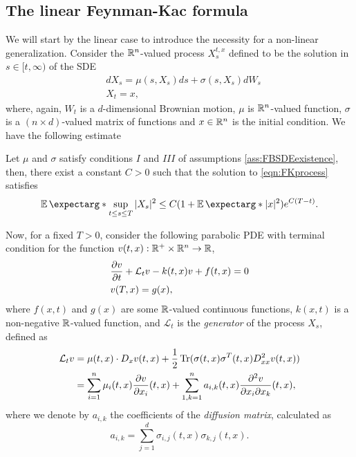 \subsection{The linear Feynman-Kac formula}
We will start by the linear case to introduce the necessity for a non-linear generalization. Consider the $\mathbb{R}^n$-valued process $X_s^{t,x}$ defined to be the solution in $s\in[t,\infty)$ of the SDE 
\begin{equation}
	\label{eqn:FKprocess}
	\begin{split}
		&dX_s=\mu(s,X_s)ds+\sigma(s,X_s)dW_s\\
		&X_t=x,
	\end{split}
\end{equation}
where, again,  $W_t$ is a $d$-dimensional Brownian motion, $\mu$ is $\mathbb{R}^n$-valued function, $\sigma$ is a $(n\times d)$-valued matrix of functions and $x\in\mathbb{R}^n$ is the initial condition. We have the following estimate 
\begin{theorem}
	\label{thm:estimationSDE}
		Let $\mu$ and $\sigma$ satisfy conditions $I$ and $III$ of assumptions \ref{ass:FBSDEexistence}, then, there exist a constant $C>0$ such that the solution to \ref{eqn:FKprocess} satisfies
		\begin{equation}
			\expect*{\sup_{t\leq s\leq T}|X_s|^2}\leq C(1+\expect*{|x|^2})e^{C(T-t)}.
		\end{equation} 
\end{theorem}

Now, for a fixed $T>0$, consider the following parabolic PDE with terminal condition for the function $v(t,x):\mathbb{R}^+\times \mathbb{R}^n\to \mathbb{R}$,
\begin{equation}
	\label{eqn:FKequation}
	\begin{split}
		&\frac{\partial v}{\partial t}+\mathcal{L}_t v-k(t,x) v+f(t,x)=0\\
		&v(T,x)=g(x),
	\end{split}
\end{equation}
where $f(x,t)$ and $g(x)$ are some $\mathbb{R}$-valued continuous functions, $k(x,t)$ is a non-negative $\mathbb{R}$-valued function, and $\mathcal{L}_t$ is the \textit{generator} of the process $X_s$, defined as
\begin{equation}
	\begin{split}
		\mathcal{L}_tv&=\mu(t,x)\cdot D_x v(t,x)+\frac{1}{2}\operatorname{Tr}(\sigma(t,x)\sigma^{T}(t,x)D_{xx}^2v(t,x))\\
		&=\sum_{i=1}^{n}\mu_i(t,x)\frac{\partial v}{\partial x_i}(t,x)+\sum_{1,k=1}^{n}a_{i,k}(t,x)\frac{\partial^2 v}{\partial x_i\partial x_k}(t,x),
	\end{split}
\end{equation} 
where we denote by $a_{i,k}$ the coefficients of the \textit{diffusion matrix}, calculated as 
\begin{equation}
	a_{i,k}=\sum_{j=1}^{d}\sigma_{i,j}(t,x)\sigma_{k,j}(t,x).
\end{equation}

